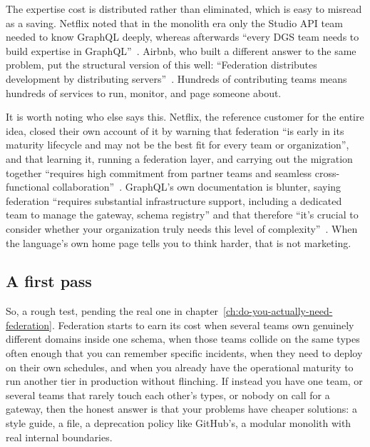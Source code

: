 The expertise cost is distributed rather than eliminated, which is easy to
misread as a saving. Netflix noted that in the monolith era only the Studio API
team needed to know GraphQL deeply, whereas afterwards \enquote{every DGS team
needs to build expertise in GraphQL}~\autocite{shikhare2020netflix2}. Airbnb,
who built a different answer to the same problem, put the structural version of
this well: \enquote{Federation distributes development by distributing
servers}~\autocite{tanner2026viaduct}. Hundreds of contributing teams means
hundreds of services to run, monitor, and page someone about.

%
It is worth noting who else says this. Netflix, the reference customer for the
entire idea, closed their own account of it by warning that federation
\enquote{is early in its maturity lifecycle and may not be the best fit for
every team or organization}, and that learning it, running a federation layer,
and carrying out the migration together \enquote{requires high commitment from
partner teams and seamless cross-functional
collaboration}~\autocite{shikhare2020netflix2}. GraphQL's own documentation is
blunter, saying federation \enquote{requires substantial infrastructure support,
including a dedicated team to manage the gateway, schema registry} and that
therefore \enquote{it's crucial to consider whether your organization truly
needs this level of complexity}~\autocite{graphqlorg2026federation}. When the
language's own home page tells you to think harder, that is not marketing.

\subsection*{A first pass}

So, a rough test, pending the real one in
chapter~\ref{ch:do-you-actually-need-federation}. Federation starts to earn its
cost when several teams own genuinely different domains inside one schema, when
those teams collide on the same types often enough that you can remember
specific incidents, when they need to deploy on their own schedules, and when
you already have the operational maturity to run another tier in production
without flinching. If instead you have one team, or several teams that rarely
touch each other's types, or nobody on call for a gateway, then the honest
answer is that your problems have cheaper solutions: a style guide, a
 file, a deprecation policy like GitHub's, a modular monolith
with real internal boundaries.

